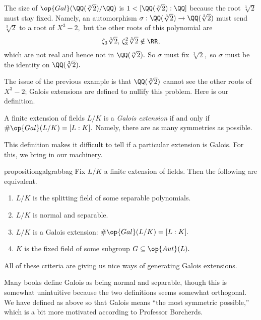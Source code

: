 \begin{ex}
	The size of $\op{Gal}(\QQ(\sqrt[3]2)/\QQ)$ is $1<[\QQ(\sqrt[3]2):\QQ]$ because the root $\sqrt[3]2$ must stay fixed. Namely, an automorphism $\sigma:\QQ(\sqrt[3]2)\to\QQ(\sqrt[3]2)$ must send $\sqrt[3]2$ to a root of $X^3-2,$ but the other roots of this polynomial are
	\[\zeta_3\sqrt[3]2,\,\zeta_3^2\sqrt[3]2\notin\RR,\]
	which are not real and hence not in $\QQ(\sqrt[3]2).$ So $\sigma$ must fix $\sqrt[3]2,$ so $\sigma$ must be the identity on $\QQ(\sqrt[3]2).$
\end{ex}
The issue of the previous example is that $\QQ(\sqrt[3]2)$ cannot see the other roots of $X^3-2$; Galois extensions are defined to nullify this problem. Here is our definition.
\begin{definition} \label{defi:galii}
	A finite extension of fields $L/K$ is a \textit{Galois extension} if and only if $\#\op{Gal}(L/K)=[L:K].$ Namely, there are as many symmetries as possible.
\end{definition}
This definition makes it difficult to tell if a particular extension is Galois. For this, we bring in our machinery.
\begin{restatable}{proposition}{galgrabbag}\label{prop:galgrabbag}
	Fix $L/K$ a finite extension of fields. Then the following are equivalent.
	\begin{enumerate}[label=(\alph*)]
		\item $L/K$ is the splitting field of some separable polynomials.
		\item $L/K$ is normal and separable.
		\item $L/K$ is a Galois extension: $\#\op{Gal}(L/K)=[L:K].$
		\item $K$ is the fixed field of some subgroup $G\subseteq\op{Aut}(L).$
	\end{enumerate}
\end{restatable}
All of these criteria are giving us nice ways of generating Galois extensions.
\begin{remark}
	Many books define Galois as being normal and separable, though this is somewhat unintuitive because the two definitions seems somewhat orthogonal. We have defined as above so that Galois means ``the most symmetric possible,'' which is a bit more motivated according to Professor Borcherds.
\end{remark}
